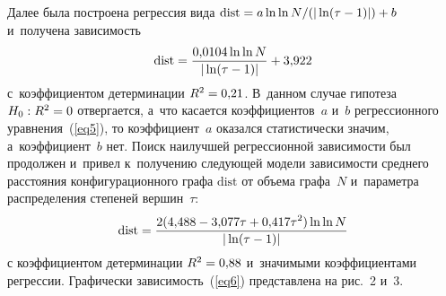 \begin{multicols}{2}
\begin{figure*} %
\vspace*{1pt}
\begin{minipage}[t]{80mm}
\begin{center}
   \mbox{%
\epsfxsize=79mm
}
\end{center}
\vspace*{-9pt}
\end{minipage}
\hfill
\vspace*{1pt}
\begin{minipage}[t]{80mm}
\begin{center}
   \mbox{%
\epsfxsize=77.81mm
}
\end{center}
\vspace*{-9pt}
\end{minipage}
\vspace*{-4pt}
\end{figure*}



Далее была построена регрессия вида $\mathrm{dist}\hm={a\ln\ln N}/({|\ln(\tau-1)|})\hm+b$ и~получена
за\-ви\-си\-мость
\begin{equation}
\label{eq5}
\mathrm{dist} = \displaystyle\frac{\displaystyle 0{,}0104\ln\ln N\mathstrut}{\displaystyle |\ln(\tau-1)|\mathstrut}+3{,}922
\end{equation}
с~коэффициентом детерминации $R^2\hm=0{,}21$. В~данном случае гипотеза $H_0: R^2\hm=0$ отвергается,
а~что касается коэффициентов~$a$ и~$b$ регрессионного уравнения~(\ref{eq5}), то коэффициент~$a$
оказался статистически значим, а~коэффициент~$b$ нет.
Поиск наилучшей регрессионной за\-ви\-си\-мости был продолжен и~привел к~получению сле\-ду\-ющей
модели за\-ви\-си\-мости сред\-не\-го рас\-сто\-яния конфигурационного графа $\mathrm{dist}$ от объема графа~$N$ 
и~па\-ра\-мет\-ра распределения степеней вершин~$\tau$:
\begin{equation}\label{eq6}
\mathrm{dist} = \displaystyle\frac{\displaystyle 2(4{,}488-3{,}077\tau+0{,}417\tau^2)\ln\ln N\mathstrut}{\displaystyle |\ln(\tau-1)|\mathstrut}
\end{equation}
с коэффициентом детерминации $R^2\hm=0{,}88$ и~значимыми коэффициентами регрессии. Графически
за\-ви\-си\-мость~(\ref{eq6}) пред\-став\-ле\-на на рис.~2 и~3.


\end{multicols}
